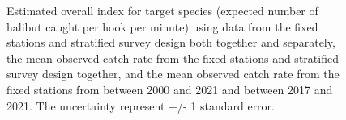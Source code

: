 \documentclass[12pt]{article}\usepackage[]{graphicx}\usepackage[]{color}
\begin{document}
\begin{figure}[htb]

{\centering {}  

}

\caption{Estimated overall index for target species (expected number of halibut caught per hook per minute) using data from the fixed stations and stratified survey design both together and separately, the mean observed catch rate from the fixed stations and stratified survey design together, and the mean observed catch rate from the fixed stations from between 2000 and 2021 and between 2017 and 2021. The uncertainty represent +/- 1 standard error.}\label{fig:target-indices}
\end{figure}
\end{document}
